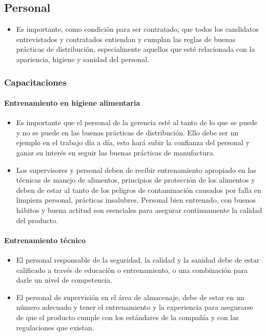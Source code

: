 \subsection{Personal}
\begin{itemize}
	\item Es importante, como condición para ser contratado, que todos los candidatos entrevistados y contratados entiendan y cumplan las reglas de buenas prácticas de distribución, especialmente aquellos que esté relacionada con la apariencia, higiene y sanidad del personal.
\end{itemize}

\subsubsection{Capacitaciones}
\paragraph{Entrenamiento en higiene alimentaria}
\begin{itemize}
	\item Es importante que el personal de la gerencia esté al tanto de lo que se puede y no se puede en las buenas prácticas de distribución. Ello debe ser un ejemplo en el trabajo día a día, esto hará subir la confianza del personal y ganar su interés en seguir las buenas prácticas de manufactura.
	\item Los supervisores y personal deben de recibir entrenamiento apropiado en las técnicas de manejo de alimentos, principios de protección de los alimentos y deben de estar al tanto de los peligros de contaminación causados por falla en limpieza personal, prácticas insalubres. Personal bien entrenado, con buenos hábitos y buena actitud son esenciales para asegurar continuamente la calidad del producto.
\end{itemize}

\paragraph{Entrenamiento técnico}
\begin{itemize}
	\item El personal responsable de la seguridad, la calidad y la sanidad debe de estar calificado a través de educación o entrenamiento, o una combinación para darle un nivel de competencia.
	\item El personal de supervisión en el área de almacenaje, debe de estar en un número adecuado y tener el entrenamiento y la experiencia para asegurarse de que el producto cumple con los estándares de la compañía y con las regulaciones que existan.
\end{itemize}

